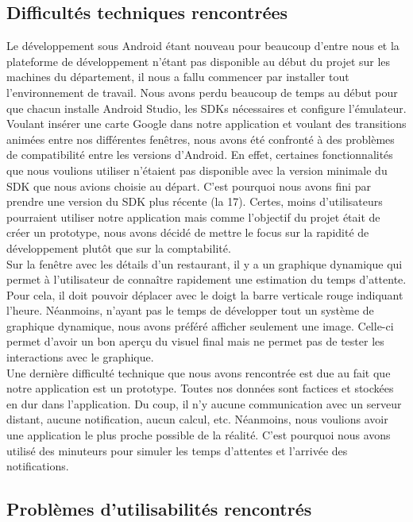 \subsection{Difficultés techniques rencontrées}
Le développement sous Android étant nouveau pour beaucoup d'entre nous et la
plateforme de développement n'étant pas disponible au début du projet sur les
machines du département, il nous a fallu commencer par installer tout
l'environnement de travail. Nous avons perdu beaucoup de temps au début
pour que chacun installe Android Studio, les SDKs nécessaires et configure
l'émulateur. \\

Voulant insérer une carte Google dans notre application et voulant des
transitions animées entre nos différentes fenêtres, nous avons été confronté
à des problèmes de compatibilité entre les versions d'Android. En effet, 
certaines fonctionnalités que nous voulions utiliser n'étaient pas disponible
avec la version minimale du SDK que nous avions choisie au départ. C'est pourquoi
nous avons fini par prendre une version du SDK plus récente (la 17). Certes,
moins d'utilisateurs pourraient utiliser notre application mais comme l'objectif
du projet était de créer un prototype, nous avons décidé de mettre le focus sur 
la rapidité de développement plutôt que sur la comptabilité. \\

Sur la fenêtre avec les détails d'un restaurant, il y a un graphique dynamique
qui permet à l'utilisateur de connaître rapidement une estimation du temps
d'attente. Pour cela, il doit pouvoir déplacer avec le doigt
la barre verticale rouge indiquant l'heure. Néanmoins, n'ayant
pas le temps de développer tout un système de graphique dynamique, nous avons
préféré afficher seulement une image. Celle-ci permet d'avoir un bon aperçu du
visuel final mais ne permet pas de tester les interactions avec le graphique.\\

Une dernière difficulté technique que nous avons rencontrée est due au fait que
notre application est un prototype. Toutes nos données sont factices et stockées
en dur dans l'application. Du coup, il n'y aucune communication avec un serveur
distant, aucune notification, aucun calcul, etc. Néanmoins, nous voulions avoir
une application le plus proche possible de la réalité. C'est pourquoi nous avons
utilisé des minuteurs pour simuler les temps d'attentes et l'arrivée des 
notifications. 

\subsection{Problèmes d'utilisabilités rencontrés}

